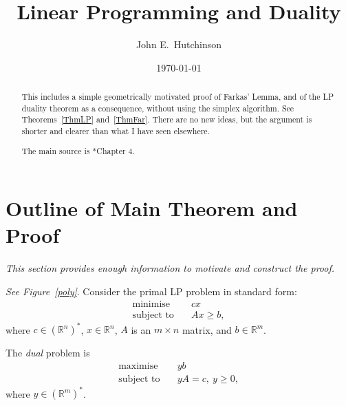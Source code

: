 \documentclass[a4paper]{amsart}
\theoremstyle{plain}
\theoremstyle{definition}
\theoremstyle{remark}
\begin{document}
\title{Linear Programming and Duality}  
\author{John E.\ Hutchinson}
\date{\today}

\begin{abstract} 
This includes a simple geometrically motivated  proof of Farkas' Lemma, and of the LP duality theorem as a consequence, without using the simplex algorithm. See Theorems~\ref{ThmLP} and~\ref{ThmFar}.  There are no new ideas, but the argument is shorter and clearer than what I have seen elsewhere.

The main source is \cite{BT}*{Chapter 4}.


\end{abstract}

\maketitle

\tableofcontents


\section{\textbf{Outline of Main Theorem and Proof}}  

\noindent \emph{This section provides enough information to motivate and construct the proof.}

\bigskip
\emph{See Figure~\ref{poly}}. 
Consider the primal LP problem in standard form:
\begin{equation} \label{primal}
\begin{aligned}
\text{minimise} \quad & cx \\
\text{subject to} \quad & Ax \geq b ,
\end{aligned}
\end{equation} 
where $ c \in (\mathbb{R}^n )^* $, $ x \in \mathbb{R}^n $, $ A $ is an $ m\times n $ matrix, and $ b \in \mathbb{R}^m$.  
 
The \emph{dual} problem is   
\begin{equation} \label{dual}
\begin{aligned}
\text{maximise} \quad & yb \\
\text{subject to} \quad & yA=c,\ y \geq 0,
\end{aligned}
\end{equation} 
 where $ y \in (\mathbb{R}^m )^*$.
 
\end{document}
